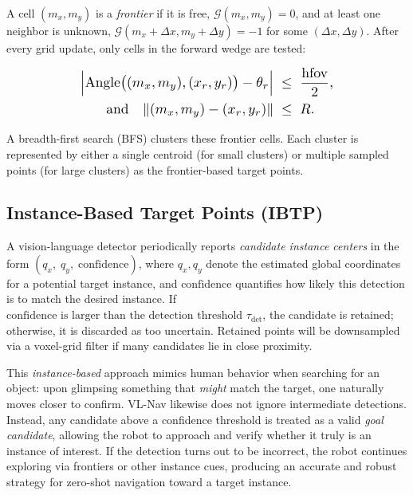 A cell $(m_x,m_y)$ is a \emph{frontier} if it is free, $\mathcal{G}(m_x,m_y)=0$, and at least one neighbor is unknown, $\mathcal{G}(m_x+\Delta x,m_y+\Delta y)=-1$ for some $(\Delta x,\Delta y)$. After every grid update, only cells in the forward wedge are tested:

\begin{equation}\label{eq:frontier}
\resizebox{0.66\linewidth}{!}{$
\begin{split}
\Bigl|\mathrm{Angle}\bigl((m_x,m_y),(x_r,y_r)\bigr) - \theta_r\Bigr|
\;&\le\; \frac{\mathrm{hfov}}{2}, \\
\text{and} \quad \|(m_x,m_y) - (x_r,y_r)\|
\;&\le\; R.
\end{split}
$}
\end{equation}

A breadth-first search (BFS) clusters these frontier cells. Each cluster is represented by either a single centroid (for small clusters) or multiple sampled points (for large clusters) as the frontier-based target points. 

\subsection{Instance-Based Target Points (IBTP)}

A vision-language detector periodically reports \emph{candidate instance centers} in the form $(q_x,\;q_y,\;\text{confidence})$,
where \(q_x, q_y\) denote the estimated global coordinates for a potential target instance, and \(\text{confidence}\) quantifies how likely this detection is to match the desired instance. If \(\text{confidence is larger than the detection threshold } \tau_{\mathrm{det}}\), the candidate is retained; otherwise, it is discarded as too uncertain. Retained points will be downsampled via a voxel-grid filter if many candidates lie in close proximity.

This \emph{instance-based} approach mimics human behavior when searching for an object: upon glimpsing something that \emph{might} match the target, one naturally moves closer to confirm. VL-Nav likewise does not ignore intermediate detections. Instead, any candidate above a confidence threshold is treated as a valid \emph{goal candidate}, allowing the robot to approach and verify whether it truly is an instance of interest. If the detection turns out to be incorrect, the robot continues exploring via frontiers or other instance cues, producing an accurate and robust strategy for zero-shot navigation toward a target instance.




